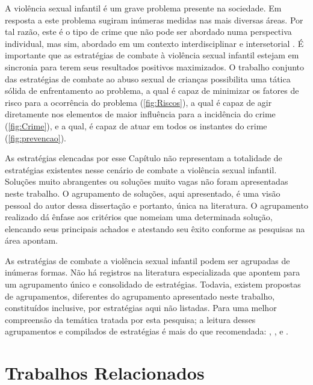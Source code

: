 A violência sexual infantil é um grave problema presente na sociedade. Em resposta a este problema sugiram inúmeras medidas nas mais diversas áreas. Por tal razão, este é o tipo de crime que não pode ser abordado numa perspectiva individual, mas sim, abordado em um contexto interdisciplinar e intersetorial \cite{maria2010papel, pinto2017avaliaccao}. É importante que as estratégias de combate à violência sexual infantil estejam em sincronia para terem seus resultados positivos maximizados. O trabalho conjunto das estratégias de combate ao abuso sexual de crianças possibilita uma tática sólida de enfrentamento ao problema, a qual é capaz de minimizar os fatores de risco para a ocorrência do problema (\autoref{fig:Riscos}), a qual é capaz de agir diretamente nos elementos de maior influência para a incidência do crime (\autoref{fig:Crime}), e a qual, é capaz de atuar em todos os instantes do crime (\autoref{fig:prevencao}).

As estratégias elencadas por esse Capítulo não representam a totalidade de estratégias existentes nesse cenário de combate a violência sexual infantil. Soluções muito abrangentes ou soluções muito vagas não foram apresentadas neste trabalho. O agrupamento de soluções, aqui apresentado, é uma visão pessoal do autor dessa dissertação e portanto, única na literatura. O agrupamento realizado dá ênfase aos critérios que nomeiam uma determinada solução, elencando seus principais achados e atestando seu êxito conforme as pesquisas na área apontam.

As estratégias de combate a violência sexual infantil podem ser agrupadas de inúmeras formas. Não há registros na literatura especializada que apontem para um agrupamento único e consolidado de estratégias. Todavia, existem propostas de agrupamentos, diferentes do agrupamento apresentado neste trabalho, constituídos inclusive, por estratégias aqui não listadas. Para uma melhor compreensão da temática tratada por esta pesquisa; a leitura desses agrupamentos e compilados de estratégias é mais do que recomendada: , ,  e .


\chapter{Trabalhos Relacionados}\label{ssec:TR}

